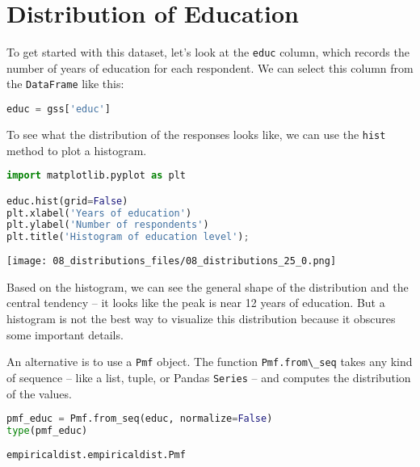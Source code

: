 \section{Distribution of Education}\label{distribution-of-education}

To get started with this dataset, let's look at the
\passthrough{\lstinline!educ!} column, which records the number of years
of education for each respondent. We can select this column from the
\passthrough{\lstinline!DataFrame!} like this:

\begin{lstlisting}[language=Python,style=source]
educ = gss['educ']
\end{lstlisting}

To see what the distribution of the responses looks like, we can use the
\passthrough{\lstinline!hist!} method to plot a histogram.

\begin{lstlisting}[language=Python,style=source]
import matplotlib.pyplot as plt

educ.hist(grid=False)
plt.xlabel('Years of education')
plt.ylabel('Number of respondents')
plt.title('Histogram of education level');
\end{lstlisting}

\begin{center}
\texttt{[image: 08\_distributions\_files/08\_distributions\_25\_0.png]}
\end{center}

Based on the histogram, we can see the general shape of the distribution
and the central tendency -- it looks like the peak is near 12 years of
education. But a histogram is not the best way to visualize this
distribution because it obscures some important details.

An alternative is to use a \passthrough{\lstinline!Pmf!} object. The
function \passthrough{\lstinline!Pmf.from\_seq!} takes any kind of
sequence -- like a list, tuple, or Pandas
\passthrough{\lstinline!Series!} -- and computes the distribution of the
values.

\begin{lstlisting}[language=Python,style=source]
pmf_educ = Pmf.from_seq(educ, normalize=False)
type(pmf_educ)
\end{lstlisting}

\begin{lstlisting}[style=output]
empiricaldist.empiricaldist.Pmf
\end{lstlisting}

